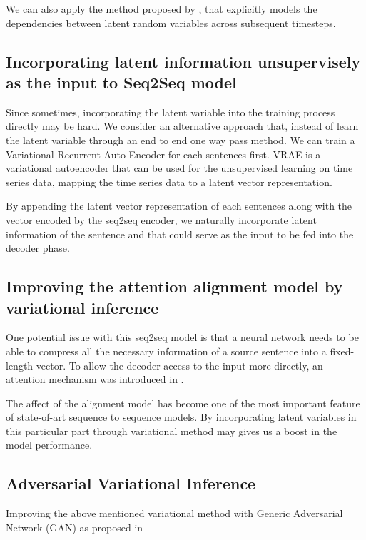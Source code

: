\documentclass{article}
\begin{document}
We can also apply the method proposed by \cite{vrnn}, that explicitly models the dependencies between latent random variables across subsequent timesteps.

\subsection{Incorporating latent information unsupervisely as the input to Seq2Seq model}
Since sometimes, incorporating the latent variable into the training process directly may be hard. We consider an alternative approach that, instead of learn the latent variable through an end to end one way pass method. We can train a Variational Recurrent Auto-Encoder \cite{vrae} for each sentences first. VRAE is a variational autoencoder that can be used for the unsupervised learning on time series data, mapping the time series data to a latent vector representation. 

By appending the latent vector representation of each sentences along with the vector encoded by the seq2seq encoder, we naturally incorporate latent information of the sentence and that could serve as the input to be fed into the decoder phase.

\subsection{Improving the attention alignment model by variational inference }

One potential issue with this seq2seq model is that a neural network needs to be able to compress all the necessary information of a source sentence into a fixed-length vector. To allow the decoder access to the input more directly, an attention mechanism was introduced in \cite{attention}.

The affect of the alignment model has become one of the most important feature of state-of-art sequence to sequence models. By incorporating latent variables in this particular part through variational method may gives us a boost in the model performance.

\subsection{Adversarial Variational Inference}
Improving the above mentioned variational method with Generic Adversarial Network (GAN) as proposed in \cite{avb}



\end{document}
